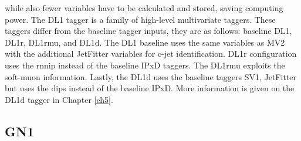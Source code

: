 while also fewer variables have to be calculated and stored, saving computing power. The DL1 tagger is a family of high-level multivariate taggers. These taggers differ from the 
baseline tagger inputs, they are as follows: baseline DL1, DL1r, DL1rmu, and DL1d. The DL1 baseline uses the same variables as MV2 with the additional JetFitter variables for c-jet 
identification. DL1r configuration uses the \gls{rnnip} instead of the baseline IPxD taggers. The DL1rmu exploits the soft-muon information. Lastly, the DL1d uses the baseline taggers 
SV1, JetFitter but uses the \gls{dips} instead of the baseline IPxD. More information is given on the DL1d tagger in Chapter \ref{ch5}.


\subsection{GN1}\label{sec:gn1}

